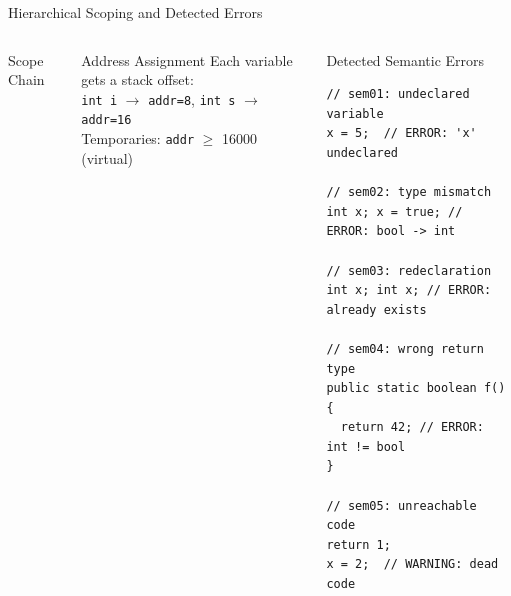 \documentclass[aspectratio=169,11pt]{beamer}
\begin{document}
\begin{frame}[fragile]{Hierarchical Scoping and Detected Errors}
\begin{columns}[t]
  \begin{block}{Scope Chain}
    \centering
  \end{block}
  \begin{exampleblock}{Address Assignment}
    \small Each variable gets a stack offset:\\
    \texttt{int i} $\to$ \texttt{addr=8}, \texttt{int s} $\to$ \texttt{addr=16}\\
    Temporaries: \texttt{addr} $\geq$ 16000 (virtual)
  \end{exampleblock}

  \begin{alertblock}{Detected Semantic Errors}
\begin{lstlisting}[style=javaslide,numbers=none]
// sem01: undeclared variable
x = 5;  // ERROR: 'x' undeclared

// sem02: type mismatch
int x; x = true; // ERROR: bool -> int

// sem03: redeclaration
int x; int x; // ERROR: already exists

// sem04: wrong return type
public static boolean f() {
  return 42; // ERROR: int != bool
}

// sem05: unreachable code
return 1;
x = 2;  // WARNING: dead code
\end{lstlisting}
  \end{alertblock}
\end{columns}
\end{frame}
\end{document}
